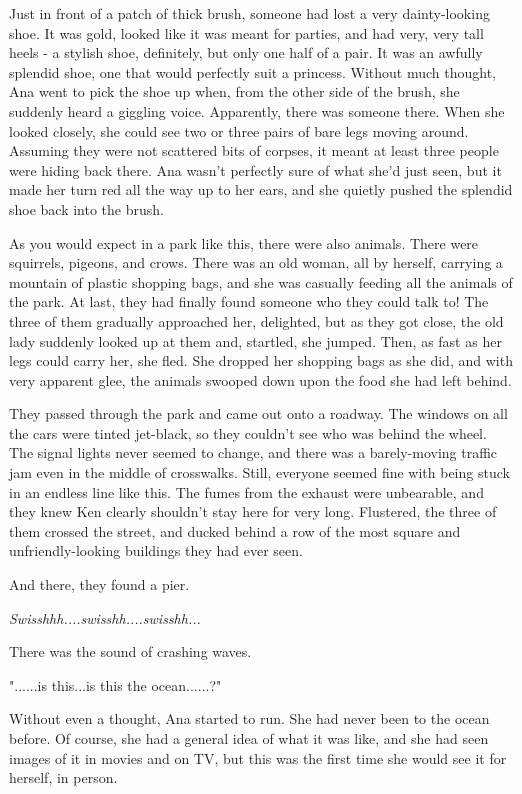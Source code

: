 \documentclass[
]{article}
\begin{document}
Just in front of a patch of thick brush, someone had lost a very
dainty-looking shoe. It was gold, looked like it was meant for parties,
and had very, very tall heels - a stylish shoe, definitely, but only one
half of a pair. It was an awfully splendid shoe, one that would
perfectly suit a princess. Without much thought, Ana went to pick the
shoe up when, from the other side of the brush, she suddenly heard a
giggling voice. Apparently, there was someone there. When she looked
closely, she could see two or three pairs of bare legs moving around.
Assuming they were not scattered bits of corpses, it meant at least
three people were hiding back there. Ana wasn't perfectly sure of what
she'd just seen, but it made her turn red all the way up to her ears,
and she quietly pushed the splendid shoe back into the brush.

As you would expect in a park like this, there were also animals. There
were squirrels, pigeons, and crows. There was an old woman, all by
herself, carrying a mountain of plastic shopping bags, and she was
casually feeding all the animals of the park. At last, they had finally
found someone who they could talk to! The three of them gradually
approached her, delighted, but as they got close, the old lady suddenly
looked up at them and, startled, she jumped. Then, as fast as her legs
could carry her, she fled. She dropped her shopping bags as she did, and
with very apparent glee, the animals swooped down upon the food she had
left behind.

They passed through the park and came out onto a roadway. The windows on
all the cars were tinted jet-black, so they couldn't see who was behind
the wheel. The signal lights never seemed to change, and there was a
barely-moving traffic jam even in the middle of crosswalks. Still,
everyone seemed fine with being stuck in an endless line like this. The
fumes from the exhaust were unbearable, and they knew Ken clearly
shouldn't stay here for very long. Flustered, the three of them crossed
the street, and ducked behind a row of the most square and
unfriendly-looking buildings they had ever seen.

And there, they found a pier.

\emph{Swisshhh....swisshh....swisshh...}

There was the sound of crashing waves.

"......is this...is this the ocean......?"

Without even a thought, Ana started to run. She had never been to the
ocean before. Of course, she had a general idea of what it was like, and
she had seen images of it in movies and on TV, but this was the first
time she would see it for herself, in person.
\end{document}
